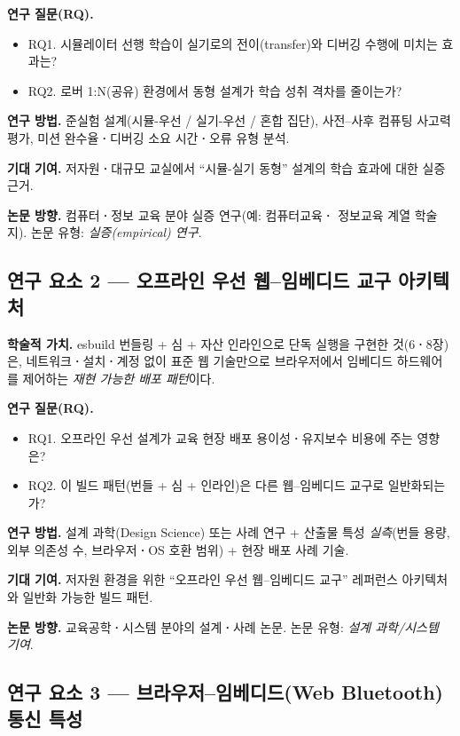 \noindent\textbf{연구 질문(RQ).}
\begin{itemize}
  \item RQ1. 시뮬레이터 선행 학습이 실기로의 전이(transfer)와 디버깅 수행에 미치는 효과는?
  \item RQ2. 로버 1:N(공유) 환경에서 동형 설계가 학습 성취 격차를 줄이는가?
\end{itemize}

\noindent\textbf{연구 방법.} 준실험 설계(시뮬-우선 / 실기-우선 / 혼합 집단),
사전--사후 컴퓨팅 사고력 평가, 미션 완수율\textbf{·}디버깅 소요 시간\textbf{·}오류 유형
분석.

\noindent\textbf{기대 기여.} 저자원\textbf{·}대규모 교실에서 ``시뮬-실기 동형'' 설계의
학습 효과에 대한 실증 근거.

\noindent\textbf{논문 방향.} 컴퓨터\textbf{·}정보 교육 분야 실증 연구(예: 컴퓨터교육\textbf{·}
정보교육 계열 학술지). 논문 유형: \emph{실증(empirical) 연구}.

\subsection{연구 요소 2 --- 오프라인 우선 웹--임베디드 교구 아키텍처}

\noindent\textbf{학술적 가치.} esbuild 번들링 +  심 + 자산 인라인으로
 단독 실행을 구현한 것(6\textbf{·}8장)은, 네트워크\textbf{·}설치\textbf{·}계정
없이 표준 웹 기술만으로 브라우저에서 임베디드 하드웨어를 제어하는 \emph{재현
가능한 배포 패턴}이다.

\noindent\textbf{연구 질문(RQ).}
\begin{itemize}
  \item RQ1. 오프라인 우선 설계가 교육 현장 배포 용이성\textbf{·}유지보수 비용에 주는 영향은?
  \item RQ2. 이 빌드 패턴(번들 + 심 + 인라인)은 다른 웹--임베디드 교구로 일반화되는가?
\end{itemize}

\noindent\textbf{연구 방법.} 설계 과학(Design Science) 또는 사례 연구 + 산출물
특성 \emph{실측}(번들 용량, 외부 의존성 수, 브라우저\textbf{·}OS 호환 범위) + 현장
배포 사례 기술.

\noindent\textbf{기대 기여.} 저자원 환경을 위한 ``오프라인 우선 웹--임베디드
교구'' 레퍼런스 아키텍처와 일반화 가능한 빌드 패턴.

\noindent\textbf{논문 방향.} 교육공학\textbf{·}시스템 분야의 설계\textbf{·}사례 논문.
논문 유형: \emph{설계 과학/시스템 기여}.

\subsection{연구 요소 3 --- 브라우저--임베디드(Web Bluetooth) 통신 특성}

